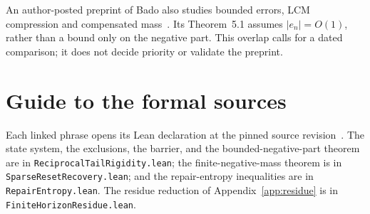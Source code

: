An author-posted preprint of Bado also studies bounded errors, LCM
compression and compensated mass~\cite{bado2026}.  Its Theorem~5.1 assumes
$|e_n|=O(1)$, rather than a bound only on the negative part.
This overlap calls for a dated comparison; it does not decide priority or
validate the preprint.


\section{Guide to the formal sources}\label{app:index}

Each linked phrase opens its Lean declaration at the pinned source
revision~\commitshort.  The state system, the exclusions, the barrier, and the
bounded-negative-part theorem are in \texttt{ReciprocalTailRigidity.lean}; the
finite-negative-mass theorem is in \texttt{SparseResetRecovery.lean}; and the
repair-entropy inequalities are in \texttt{RepairEntropy.lean}.  The residue
reduction of Appendix~\ref{app:residue} is in
\texttt{FiniteHorizonResidue.lean}.


